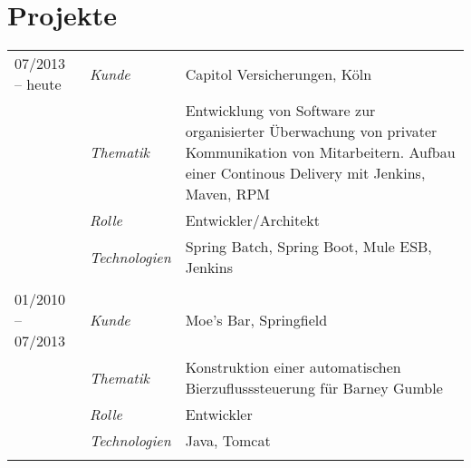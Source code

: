\section*{Projekte}
\renewcommand{\arraystretch}{1.3}
\begin{longtable}{@{}>{}p{4cm}>{\itshape}p{2cm}>{}p{9cm}}
07/2013 -- heute	& Kunde 	& Capitol Versicherungen, Köln\\
\nopagebreak		& Thematik	& Entwicklung von Software zur organisierter Überwachung von privater Kommunikation von Mitarbeitern. Aufbau einer Continous Delivery mit Jenkins, Maven, RPM\\
\nopagebreak		& Rolle 	& Entwickler/Architekt\\
\nopagebreak		& Technologien	& Spring Batch, Spring Boot, Mule ESB, Jenkins\\\\

01/2010 -- 07/2013	& Kunde 	& Moe's Bar, Springfield\\
\nopagebreak		& Thematik	& Konstruktion einer automatischen Bierzuflusssteuerung für Barney Gumble\\
\nopagebreak		& Rolle 	& Entwickler\\
\nopagebreak		& Technologien	& Java, Tomcat\\\\

\end{longtable}
